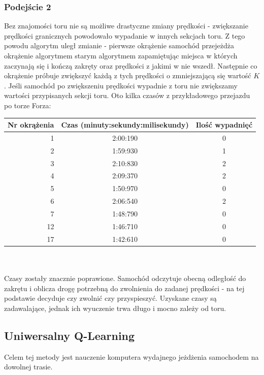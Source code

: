 \documentclass{article}
\begin{document}
\subsubsection{Podejście 2}
Bez znajomości toru nie są możliwe drastyczne zmiany prędkości - zwiększanie prędkości granicznych powodowało wypadanie w innych sekcjach toru. Z tego powodu algorytm uległ zmianie - pierwsze okrążenie samochód przejeżdża okrążenie algorytmem starym algorytmem zapamiętując miejsca w których zaczynają się i kończą zakręty oraz prędkości z jakimi w nie wszedł. Następnie co okrążenie próbuje zwiększyć każdą z tych prędkości o zmniejszającą się wartość \(K\). Jeśli samochód po zwiększeniu prędkości wypadnie z toru nie zwiększamy wartości przypisanych sekcji toru. Oto kilka czasów z przykładowego przejazdu po torze Forza:\\

\begin{tabular}{|r|c|c|} \hline
Nr okrążenia & Czas (minuty:sekundy:milisekundy) & Ilość wypadnięć\\
\hline 
1 & 2:00:190 & 0 \\
2 & 1:59:930 & 1 \\
3 & 2:10:830 & 2 \\
4 & 2:09:370 & 2 \\
5 & 1:50:970 & 0 \\
6 & 2:06:540 & 2 \\
7 & 1:48:790 & 0 \\
12 & 1:46:710 & 0 \\
17 & 1:42:610 & 0 \\
\hline 
\end{tabular}\\\\

Czasy zostały znacznie poprawione. Samochód odczytuje obecną odległość do zakrętu i oblicza drogę potrzebną do zwolnienia do zadanej prędkości - na tej podstawie decyduje czy zwolnić czy przyspieszyć. Uzyskane czasy są zadawalające, jednak ich wyuczenie trwa długo i mocno zależy od toru.
\subsection{Uniwersalny Q-Learning}

Celem tej metody jest nauczenie komputera wydajnego jeżdżenia samochodem na dowolnej trasie.
\end{document}
